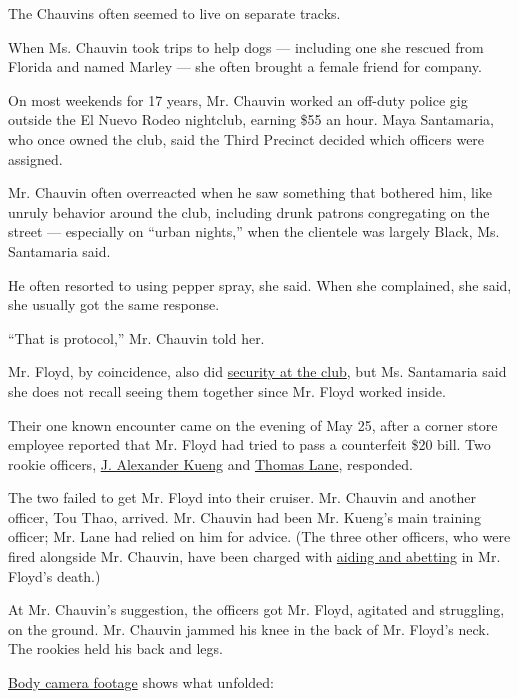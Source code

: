 The Chauvins often seemed to live on separate tracks.

When Ms. Chauvin took trips to help dogs --- including one she rescued
from Florida and named Marley --- she often brought a female friend for
company.

On most weekends for 17 years, Mr. Chauvin worked an off-duty police gig
outside the El Nuevo Rodeo nightclub, earning \$55 an hour. Maya
Santamaria, who once owned the club, said the Third Precinct decided
which officers were assigned.

Mr. Chauvin often overreacted when he saw something that bothered him,
like unruly behavior around the club, including drunk patrons
congregating on the street --- especially on ``urban nights,'' when the
clientele was largely Black, Ms. Santamaria said.

He often resorted to using pepper spray, she said. When she complained,
she said, she usually got the same response.

``That is protocol,'' Mr. Chauvin told her.

Mr. Floyd, by coincidence, also did
\href{https://www.nytimes3xbfgragh.onion/2020/05/29/us/derek-chauvin-george-floyd-worked-together.html}{security
at the club}, but Ms. Santamaria said she does not recall seeing them
together since Mr. Floyd worked inside.

Their one known encounter came on the evening of May 25, after a corner
store employee reported that Mr. Floyd had tried to pass a counterfeit
\$20 bill. Two rookie officers,
\href{https://www.nytimes3xbfgragh.onion/2020/06/27/us/minneapolis-police-officer-kueng.html}{J.
Alexander Kueng} and
\href{https://www.nytimes3xbfgragh.onion/2020/07/08/us/george-floyd-body-camera-transcripts.html}{Thomas
Lane}, responded.

The two failed to get Mr. Floyd into their cruiser. Mr. Chauvin and
another officer, Tou Thao, arrived. Mr. Chauvin had been Mr. Kueng's
main training officer; Mr. Lane had relied on him for advice. (The three
other officers, who were fired alongside Mr. Chauvin, have been charged
with
\href{https://www.nytimes3xbfgragh.onion/2020/07/08/us/george-floyd-body-camera-transcripts.html}{aiding
and abetting} in Mr. Floyd's death.)

At Mr. Chauvin's suggestion, the officers got Mr. Floyd, agitated and
struggling, on the ground. Mr. Chauvin jammed his knee in the back of
Mr. Floyd's neck. The rookies held his back and legs.

\href{https://www.nytimes3xbfgragh.onion/2020/08/11/us/george-floyd-body-cam-full-video.html}{Body
camera footage} shows what unfolded:

